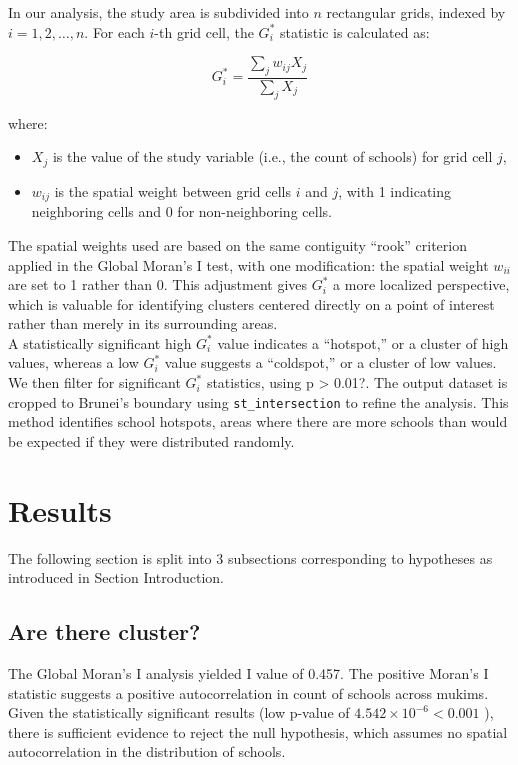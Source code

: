 \documentclass [12 pt]{article}
\begin{document}
In our analysis, the study area is subdivided into \( n \) rectangular grids, indexed by \( i = 1, 2, \dots, n \). For each \( i \)-th grid cell, the \( G_i^* \) statistic is calculated as:

\begin{equation}
G_i^* = \frac{\sum_j w_{ij} X_j}{\sum_j X_j}
\end{equation}

where:
\begin{itemize}
    \item \( X_j \) is the value of the study variable (i.e., the count of schools) for grid cell \( j \),
    \item \( w_{ij} \) is the spatial weight between grid cells \( i \) and \( j \), with 1 indicating neighboring cells and 0 for non-neighboring cells.
\end{itemize}

The spatial weights used are based on the same contiguity “rook” criterion applied in the Global Moran’s I test, with one modification: the spatial weight \( w_{ii} \) are set to 1 rather than 0. This adjustment gives \( G_i^* \) a more localized perspective, which is valuable for identifying clusters centered directly on a point of interest rather than merely in its surrounding areas. \\

A statistically significant high \( G_i^* \) value indicates a “hotspot,” or a cluster of high values, whereas a low \( G_i^* \) value suggests a “coldspot,” or a cluster of low values. \\

We then filter for significant \( G_i^* \) statistics, using p > 0.01?. The output dataset is cropped to Brunei’s boundary using \texttt{st\_intersection} to refine the analysis. This method identifies school hotspots, areas where there are more schools than would be expected if they were distributed randomly. \\



\section{Results}
The following section is split into 3 subsections corresponding to hypotheses as introduced in Section Introduction.

\subsection{Are there cluster?}
The Global Moran's I analysis yielded I value of 0.457. The positive Moran’s I statistic suggests a positive autocorrelation in count of schools across mukims. Given the statistically significant results (low p-value of $4.542 \times 10^{-6} < 0.001$ ), there is sufficient evidence to reject the null hypothesis, which assumes no spatial autocorrelation in the distribution of schools. \\
\end{document}
